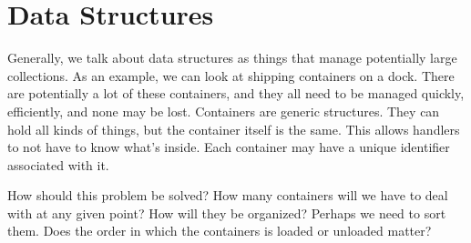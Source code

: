 \documentclass{article}
\begin{document}
\section{Data Structures}
Generally, we talk about data structures as things that manage potentially
large collections. As an example, we can look at shipping containers on a dock.
There are potentially a lot of these containers, and they all need to be
managed quickly, efficiently, and none may be lost. Containers are generic
structures. They can hold all kinds of things, but the container itself is the
same. This allows handlers to not have to know what's inside. Each container
may have a unique identifier associated with it.

How should this problem be solved? How many containers will we have to deal
with at any given point? How will they be organized? Perhaps we need to sort
them. Does the order in which the containers is loaded or unloaded matter?
\end{document}
